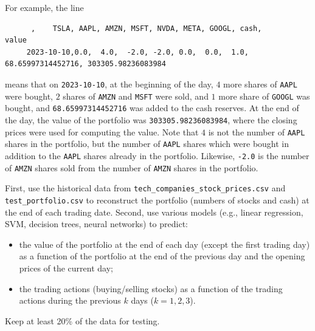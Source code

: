 \documentclass{article}
\begin{document}
   For example, the line
   \begin{lstlisting}
      ,    TSLA, AAPL, AMZN, MSFT, NVDA, META, GOOGL, cash,               value
     2023-10-10,0.0,  4.0,  -2.0, -2.0, 0.0,  0.0,  1.0,   68.65997314452716, 303305.98236083984
   \end{lstlisting}
   means that on \lstinline$2023-10-10$, at the beginning of the day, $4$ more shares of \lstinline$AAPL$ were bought, $2$ shares of \lstinline$AMZN$ and \lstinline$MSFT$ were
   sold, and $1$ more share of \lstinline$GOOGL$ was bought, and \lstinline$68.65997314452716$ was added to the cash reserves. At the end of the day,
   the value of the portfolio was \lstinline$303305.98236083984$, where the closing prices were used for computing the value.
   Note that $4$ is not the number of \lstinline$AAPL$ shares in the portfolio, but the number of \lstinline$AAPL$ shares which were bought in addition to
   the \lstinline$AAPL$ shares already in the portfolio. Likewise, \lstinline$-2.0$ is the number of \lstinline$AMZN$ shares sold from the number of \lstinline$AMZN$ shares in
   the portfolio.

   First, use the historical data from \lstinline$tech_companies_stock_prices.csv$ and \lstinline$test_portfolio.csv$
   to reconstruct the portfolio (numbers of stocks and cash) at the end of each trading date. Second, use various models
   (e.g., linear regression, SVM, decision trees, neural networks) to predict:
   \begin{itemize}
   \item the value of the portfolio at the end of each day (except the first trading day) as a function of the portfolio at the end of the previous day and the opening prices of the current day;
   \item the trading actions (buying/selling stocks) as a function of the trading actions during the previous $k$ days ($k=1,2,3$).
   \end{itemize}

   Keep at least 20\% of the data for testing.

\end{document}
